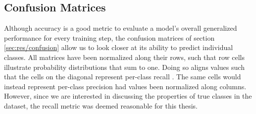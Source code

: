 

\subsection{Confusion Matrices}



Although accuracy is a good metric to evaluate a model's overall generalized performance for every training step, the confusion matrices of section \ref{sec:res/confusion} allow us to look closer at its ability to predict individual classes. All matrices have been normalized along their rows, such that row cells illustrate probability distributions that sum to one. Doing so aligns values such that the cells on the diagonal represent per-class recall
. The same cells would instead represent per-class precision had values been normalized along columns. However, since we are interested in discussing the properties of true classes in the dataset, the recall metric was deemed reasonable for this thesis.

